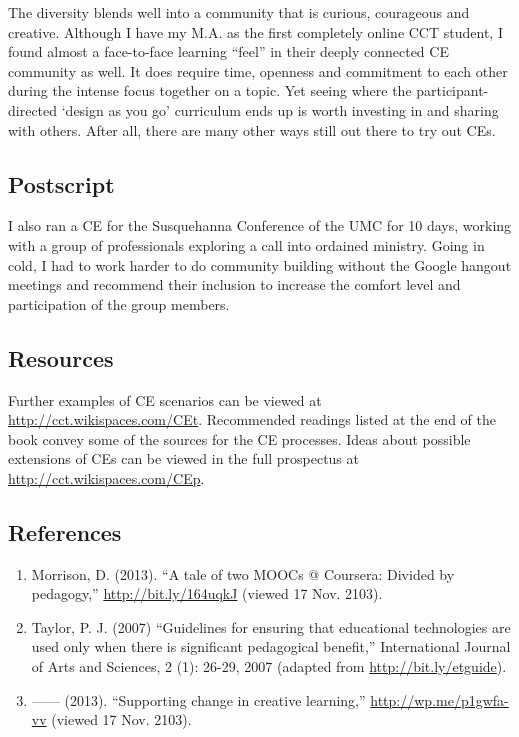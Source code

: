 The diversity blends well into a
community that is curious, courageous and creative. Although I have my
M.A. as the first completely online CCT student, I found almost a
face-to-face learning ``feel'' in their deeply connected CE community as
well. It does require time, openness and commitment to each other during
the intense focus together on a topic. Yet seeing where the
participant-directed `design as you go' curriculum ends up is worth
investing in and sharing with others. After all, there are many other
ways still out there to try out CEs.

\subsection{Postscript}

I also ran a CE for the Susquehanna Conference of the UMC for 10 days,
working with a group of professionals exploring a call into ordained
ministry. Going in cold, I had to work harder to do community building
without the Google hangout meetings and recommend their inclusion to
increase the comfort level and participation of the group members.

\subsection{Resources}

Further examples of CE scenarios can be viewed at
\href{http://cct.wikispaces.com/CEt}{http://cct.wikispaces.com/CEt}.
Recommended readings listed at the end of the book convey some of the
sources for the CE processes. Ideas about possible extensions of CEs
can be viewed in the full prospectus at
\href{http://cct.wikispaces.com/CEp}{http://cct.wikispaces.com/CEp}.

\subsection{References}

\begin{enumerate}
\item
  Morrison, D. (2013). ``A tale of two MOOCs @ Coursera: Divided by
  pedagogy,'' \href{http://bit.ly/164uqkJ}{http://bit.ly/164uqkJ}
  (viewed 17 Nov. 2103).
\item
  Taylor, P. J. (2007) ``Guidelines for ensuring that educational
  technologies are used only when there is significant pedagogical
  benefit,'' International Journal of Arts and Sciences, 2 (1): 26-29,
  2007 (adapted from
  \href{http://bit.ly/etguide}{http://bit.ly/etguide}).
\item
  ------ (2013). ``Supporting change in creative learning,''
  \href{http://wp.me/p1gwfa-vv}{http://wp.me/p1gwfa-vv} (viewed 17 Nov.
  2103).
\end{enumerate}
